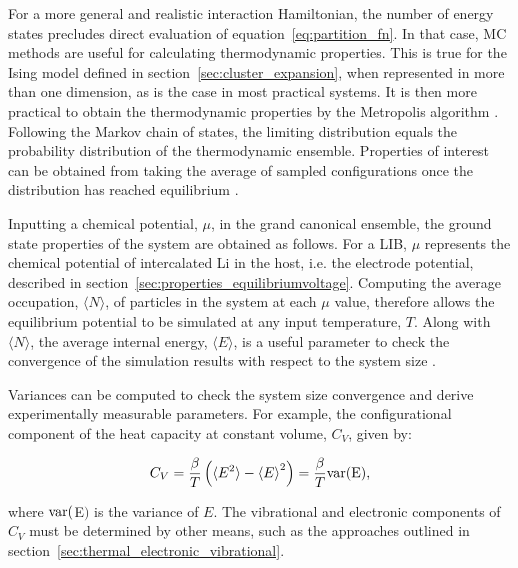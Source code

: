 \documentclass[../main.tex]{subfiles}
\begin{document}
For a more general and realistic interaction Hamiltonian, the number of energy states precludes direct evaluation of equation~\ref{eq:partition_fn}. In that case, MC methods are useful for calculating thermodynamic properties. This is true for the Ising model defined in section~\ref{sec:cluster_expansion}, when represented in more than one dimension, as is the case in most practical systems.  It is then more practical to obtain the thermodynamic properties by the Metropolis algorithm \cite{Metropolis1953}. Following the Markov chain of states, the limiting distribution equals the probability distribution of the thermodynamic ensemble. Properties of interest can be obtained from taking the average of sampled configurations once the distribution has reached equilibrium \cite{oviedo2015underpotential}.

Inputting a chemical potential, $\mu$, in the grand canonical ensemble, the ground state properties of the system are obtained as follows. For a LIB, $\mu$ represents the chemical potential of intercalated Li in the host, i.e. the electrode potential, described in section~\ref{sec:properties_equilibriumvoltage}. Computing the average occupation, $\langle N \rangle$, of particles in the system at each $\mu$ value, therefore allows the equilibrium potential to be simulated at any input temperature, $T$. Along with $\langle N \rangle$, the average internal energy, $\langle{E}\rangle$, is a useful parameter to check the convergence of the simulation results with respect to the system size \cite{mercer_influence_2017,Binder2009book,Kim2001h,darling1999}.

Variances can be computed to check the system size convergence and derive experimentally measurable parameters. For example, the configurational component of the heat capacity at constant volume, $C_{V}$, given by:

\begin{equation}
    C_{V} = \frac{\beta}{T}\left(\langle{E^{2}}\rangle -{\langle{E}\rangle}^{2}\right) =  \frac{\beta}{T}\rm{var}(E),
    \label{eq:mc_heat_cap}
\end{equation}

where $\rm{var}($E$)$ is the variance of $E$. The vibrational and electronic components of $C_{V}$ must be determined by other means, such as the approaches outlined in section~\ref{sec:thermal_electronic_vibrational}. 
\end{document}
